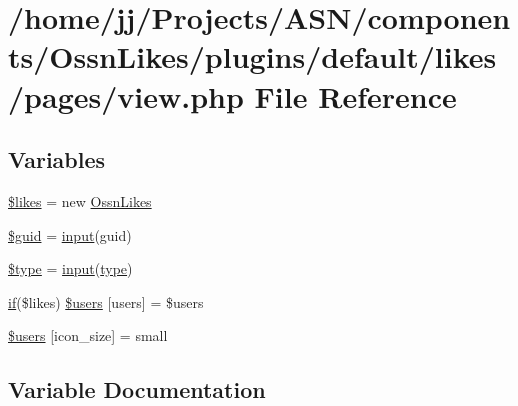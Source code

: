 \hypertarget{components_2_ossn_likes_2plugins_2default_2likes_2pages_2view_8php}{}\section{/home/jj/\+Projects/\+A\+S\+N/components/\+Ossn\+Likes/plugins/default/likes/pages/view.php File Reference}
\label{components_2_ossn_likes_2plugins_2default_2likes_2pages_2view_8php}
\subsection*{Variables}
\begin{DoxyCompactItemize}
\item 
\hyperlink{components_2_ossn_likes_2plugins_2default_2likes_2pages_2view_8php_a00ea02f45d559450e8e9af1f756a4721}{\$likes} = new \hyperlink{class_ossn_likes}{Ossn\+Likes}
\item 
\hyperlink{components_2_ossn_likes_2plugins_2default_2likes_2pages_2view_8php_af99126304cbcb2e1483892c40bb3aae4}{\$guid} = \hyperlink{ossn_8lib_8input_8php_a64ebee98b041c4f75f71ed3cd73cc8ed}{input}(\textquotesingle{}guid\textquotesingle{})
\item 
\hyperlink{components_2_ossn_likes_2plugins_2default_2likes_2pages_2view_8php_a9a4a6fba2208984cabb3afacadf33919}{\$type} = \hyperlink{ossn_8lib_8input_8php_a64ebee98b041c4f75f71ed3cd73cc8ed}{input}(\textquotesingle{}\hyperlink{_ossn_wall_2actions_2wall_2post_2group_8php_a2dc1bb4e1ed0029daa81ac0776b14b51}{type}\textquotesingle{})
\item 
\hyperlink{jquery_8tokeninput_8js_ad8dd46a3cbc004569e34401e9e71771a}{if}(\$likes) \hyperlink{components_2_ossn_likes_2plugins_2default_2likes_2pages_2view_8php_ab828cba57b1342e12b923c11a25557d9}{\$users} \mbox{[}\textquotesingle{}users\textquotesingle{}\mbox{]} = \$users
\item 
\hyperlink{components_2_ossn_likes_2plugins_2default_2likes_2pages_2view_8php_ace52cd280f9055fa6101412fcc4311e8}{\$users} \mbox{[}\textquotesingle{}icon\+\_\+size\textquotesingle{}\mbox{]} = \textquotesingle{}small\textquotesingle{}
\end{DoxyCompactItemize}


\subsection{Variable Documentation}
